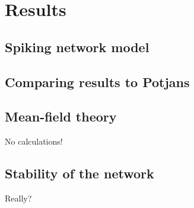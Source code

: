 \section{Results}
\label{sec:results}

\subsection{Spiking network model}


\subsection{Comparing results to Potjans}

\subsection{Mean-field theory}
No calculations!

\subsection{Stability of the network}
Really?
